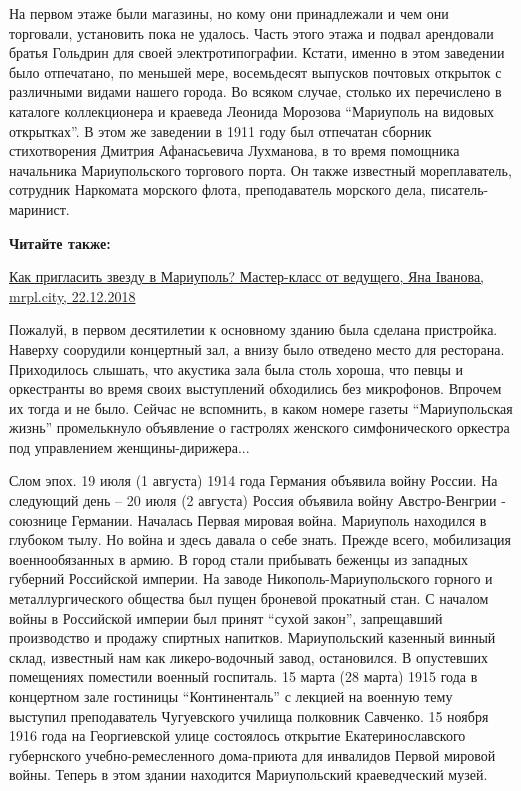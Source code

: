 На первом этаже были магазины, но кому они принадлежали и чем они торговали,
установить пока не удалось. Часть этого этажа и подвал арендовали братья
Гольдрин для своей электротипографии. Кстати, именно в этом заведении было
отпечатано, по меньшей мере, восемьдесят выпусков почтовых открыток с
различными видами нашего города. Во всяком случае, столько их перечислено в
каталоге коллекционера и краеведа Леонида Морозова \enquote{Мариуполь на видовых
открытках}. В этом же заведении в 1911 году был отпечатан сборник стихотворения
Дмитрия Афанасьевича Лухманова, в то время помощника начальника Мариупольского
торгового порта. Он также известный мореплаватель, сотрудник Наркомата морского
флота, преподаватель морского дела, писатель-маринист.

\textbf{Читайте также:} 

\href{https://mrpl.city/news/view/kak-priglasit-zvezdu-v-mariupol-master-klass-ot-vedushhego-intervyu}{%
Как пригласить звезду в Мариуполь? Мастер-класс от ведущего, Яна Іванова, mrpl.city, 22.12.2018}

Пожалуй, в первом десятилетии к основному зданию была сделана пристройка.
Наверху соорудили концертный зал, а внизу было отведено место для ресторана.
Приходилось слышать, что акустика зала была столь хороша, что певцы и
оркестранты во время своих выступлений обходились без микрофонов. Впрочем их
тогда и не было. Сейчас не вспомнить, в каком номере газеты \enquote{Мариупольская
жизнь} промелькнуло объявление о гастролях женского симфонического оркестра под
управлением женщины-дирижера...

Слом эпох. 19 июля (1 августа) 1914 года Германия объявила войну России. На
следующий день – 20 июля (2 августа) Россия объявила войну Австро-Венгрии -
союзнице Германии. Началась Первая мировая война. Мариуполь находился в
глубоком тылу. Но война и здесь давала о себе знать. Прежде всего, мобилизация
военнообязанных в армию. В город стали прибывать беженцы из западных губерний
Российской империи. На заводе Никополь-Мариупольского горного и
металлургического общества был пущен броневой прокатный стан. С началом войны в
Российской империи был принят \enquote{сухой закон}, запрещавший производство и продажу
спиртных напитков. Мариупольский казенный винный склад, известный нам как
ликеро-водочный завод, остановился. В опустевших помещениях поместили военный
госпиталь. 15 марта (28 марта) 1915 года в концертном зале гостиницы
\enquote{Континенталь} с лекцией на военную тему выступил преподаватель Чугуевского
училища полковник Савченко. 15 ноября 1916 года на Георгиевской улице
состоялось открытие Екатеринославского губернского учебно-ремесленного
дома-приюта для инвалидов Первой мировой войны. Теперь в этом здании находится
Мариупольский краеведческий музей.

